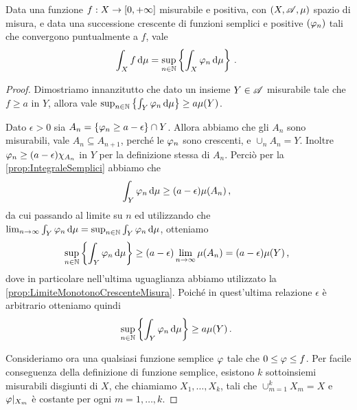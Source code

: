 \begin{proposition} \label{prop:DefinizioneEquivalenteIntegralePositive}
	Data una funzione $f:X\to[0,+\infty]$ misurabile e positiva, con $(X,\mathscr A,\mu)$ spazio di misura, e data una successione crescente di funzioni semplici e positive $(\varphi_n)$ tali che convergono puntualmente a $f$, vale 
	\begin{equation*}
		\int_X f\,\mathrm d\mu=\sup_{n\in\mathbb N}\left\{\int_X\varphi_n\,\mathrm d\mu\right\}\, \text{. }
	\end{equation*}
\end{proposition}
\begin{proof}
	Dimostriamo innanzitutto che dato un insieme $Y\in \mathscr A$ misurabile tale che $f\ge a$ in $Y$, allora vale $\sup_{n\in\mathbb N}\left\{\int_Y\varphi_n\,\mathrm d\mu\right\}\ge a\mu(Y)$.
	
	Dato $\epsilon>0$ sia $A_n=\{\varphi_n\ge a-\epsilon\}\cap Y$. Allora abbiamo che gli $A_n$ sono misurabili, vale $A_n\subseteq A_{n+1}$, perché le $\varphi_n$ sono crescenti, e $\cup_nA_n=Y$. Inoltre $\varphi_n\ge (a-\epsilon)\chi_{A_n}$ in $Y$ per la definizione stessa di $A_n$. Perciò per la \cref{prop:IntegraleSemplici} abbiamo che
	\begin{equation*}
		\int_Y\varphi_n\,\mathrm d\mu\ge(a-\epsilon)\mu(A_n)\, \text{, }
	\end{equation*}
	da cui passando al limite su $n$ ed utilizzando che $\lim_{n\to\infty}\int_Y\varphi_n\,\mathrm d\mu=\sup_{n\in\mathbb N}\int_Y\varphi_n\,\mathrm d\mu$, otteniamo
	\begin{equation*}
		\sup_{n\in\mathbb N}\left\{\int_Y\varphi_n\,\mathrm d\mu\right\}\ge(a-\epsilon)\lim_{n\to\infty}\mu(A_n)=(a-\epsilon)\mu(Y)\, \text{, }
	\end{equation*}
	dove in particolare nell'ultima uguaglianza abbiamo utilizzato la \cref{prop:LimiteMonotonoCrescenteMisura}. Poiché in quest'ultima relazione $\epsilon$ è arbitrario otteniamo quindi
	\begin{equation*}
		\sup_{n\in\mathbb N}\left\{\int_Y\varphi_n\,\mathrm d\mu\right\}\ge a\mu(Y)\, \text{. }
	\end{equation*}

	Consideriamo ora una qualsiasi funzione semplice $\varphi$ tale che $0\le \varphi\le f$. Per facile conseguenza della definizione di funzione semplice, esistono $k$ sottoinsiemi misurabili disgiunti di $X$, che chiamiamo $X_1,\dots,X_k$, tali che $\cup_{m=1}^kX_m=X$ e $\varphi|_{X_m}$ è costante per ogni $m=1,\dots,k$.
	

\end{proof}
